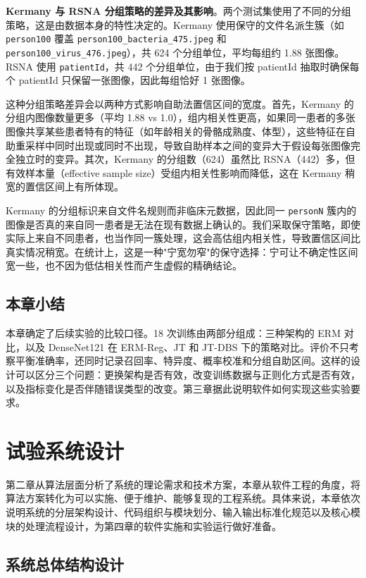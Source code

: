 \documentclass[12pt,a4paper,UTF8,openany]{ctexbook}
\begin{document}
\textbf{Kermany 与 RSNA 分组策略的差异及其影响}。两个测试集使用了不同的分组策略，这是由数据本身的特性决定的。Kermany 使用保守的文件名派生簇（如 \texttt{person100} 覆盖 \texttt{person100\_bacteria\_475.jpeg} 和 \texttt{person100\_virus\_476.jpeg}），共 624 个分组单位，平均每组约 1.88 张图像。RSNA 使用 \texttt{patientId}，共 442 个分组单位，由于我们按 patientId 抽取时确保每个 patientId 只保留一张图像，因此每组恰好 1 张图像。

这种分组策略差异会以两种方式影响自助法置信区间的宽度。首先，Kermany 的分组内图像数量更多（平均 1.88 vs 1.0），组内相关性更高，如果同一患者的多张图像共享某些患者特有的特征（如年龄相关的骨骼成熟度、体型），这些特征在自助重采样中同时出现或同时不出现，导致自助样本之间的变异大于假设每张图像完全独立时的变异。其次，Kermany 的分组数（624）虽然比 RSNA（442）多，但有效样本量（effective sample size）受组内相关性影响而降低，这在 Kermany 稍宽的置信区间上有所体现。

Kermany 的分组标识来自文件名规则而非临床元数据，因此同一 \texttt{personN} 簇内的图像是否真的来自同一患者是无法在现有数据上确认的。我们采取保守策略，即使实际上来自不同患者，也当作同一簇处理，这会高估组内相关性，导致置信区间比真实情况稍宽。在统计上，这是一种"宁宽勿窄"的保守选择：宁可让不确定性区间宽一些，也不因为低估相关性而产生虚假的精确结论。

\section{本章小结}

本章确定了后续实验的比较口径。18 次训练由两部分组成：三种架构的 ERM 对比，以及 DenseNet121 在 ERM-Reg、JT 和 JT-DBS 下的策略对比。评价不只考察平衡准确率，还同时记录召回率、特异度、概率校准和分组自助区间。这样的设计可以区分三个问题：更换架构是否有效，改变训练数据与正则化方式是否有效，以及指标变化是否伴随错误类型的改变。第三章据此说明软件如何实现这些实验要求。

\chapter{试验系统设计}

第二章从算法层面分析了系统的理论需求和技术方案，本章从软件工程的角度，将算法方案转化为可以实施、便于维护、能够复现的工程系统。具体来说，本章依次说明系统的分层架构设计、代码组织与模块划分、输入输出标准化规范以及核心模块的处理流程设计，为第四章的软件实施和实验运行做好准备。

\section{系统总体结构设计}
\end{document}
